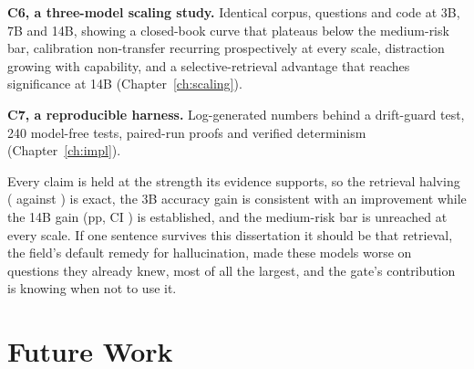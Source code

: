 \textbf{C6, a three-model scaling study.} Identical corpus, questions and
code at 3B, 7B and 14B, showing a closed-book curve that plateaus below the
medium-risk bar, calibration non-transfer recurring prospectively at every
scale, distraction growing with capability, and a selective-retrieval
advantage that reaches significance at 14B (Chapter~\ref{ch:scaling}).

\textbf{C7, a reproducible harness.} Log-generated numbers behind a
drift-guard test, 240 model-free tests, paired-run proofs and verified
determinism (Chapter~\ref{ch:impl}).

Every claim is held at the strength its evidence supports, so the retrieval
halving (\retPfiveMcq{} against \retPoneMcq{}) is exact, the 3B accuracy gain
is consistent with an improvement while the 14B gain
(\diffFourteenPfivePone{}pp, CI \diffFourteenPfivePoneCI{}) is established,
and the medium-risk bar is unreached at every scale. If one sentence survives
this dissertation it should be that retrieval, the field's default remedy for
hallucination, made these models worse on questions they already knew, most of
all the largest, and the gate's contribution is knowing when not to use it.

\section{Future Work}
\label{sec:conc-future}

